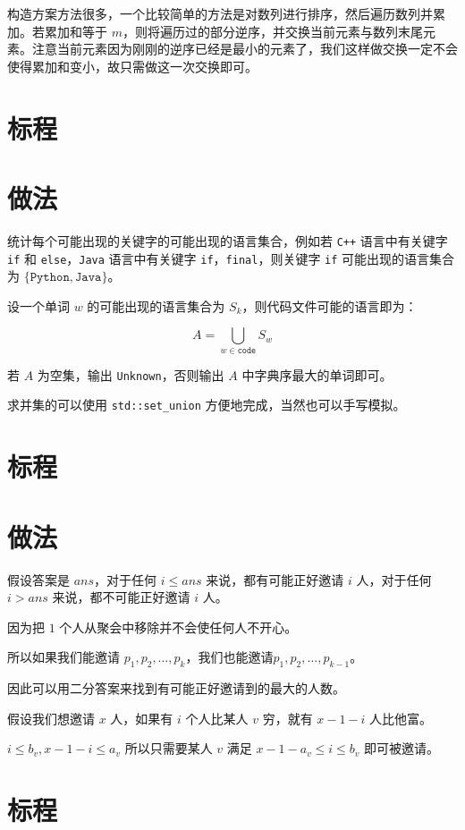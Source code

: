 \documentclass{../cpct/ctsol}
\begin{document}
构造方案方法很多，一个比较简单的方法是对数列进行排序，然后遍历数列并累加。若累加和等于 $m$，则将遍历过的部分逆序，并交换当前元素与数列末尾元素。注意当前元素因为刚刚的逆序已经是最小的元素了，我们这样做交换一定不会使得累加和变小，故只需做这一次交换即可。

\section*{标程}


\makesolution
\section*{做法}

统计每个可能出现的关键字的可能出现的语言集合，例如若 \texttt{C++} 语言中有关键字 \texttt{if} 和 \texttt{else}，\texttt{Java} 语言中有关键字 \texttt{if}，\texttt{final}，则关键字 \texttt{if} 可能出现的语言集合为 $\{\texttt{Python}, \texttt{Java}\}$。

设一个单词 $w$ 的可能出现的语言集合为 $S_k$，则代码文件可能的语言即为：

$$A = \bigcup\limits_{w \in \texttt{code}} S_w$$

若 $A$ 为空集，输出 \texttt{Unknown}，否则输出 $A$ 中字典序最大的单词即可。

求并集的可以使用 \lstinline{std::set_union} 方便地完成，当然也可以手写模拟。

\section*{标程}


\makesolution
\section*{做法}

假设答案是 $ans$，对于任何 $i \leq ans$ 来说，都有可能正好邀请 $i$ 人，对于任何 $i > ans$ 来说，都不可能正好邀请 $i$ 人。

因为把 $1$ 个人从聚会中移除并不会使任何人不开心。

所以如果我们能邀请 $p_1,p_2,\dots,p_k$，我们也能邀请$p_1,p_2,\dots,p_{k-1}$。

因此可以用二分答案来找到有可能正好邀请到的最大的人数。

假设我们想邀请 $x$ 人，如果有 $i$ 个人比某人 $v$ 穷，就有 $x-1-i$ 人比他富。

$i \leq b_v,x-1-i \leq a_v$ 所以只需要某人 $v$ 满足 $x-1-a_v \leq i \leq b_v$ 即可被邀请。

\section*{标程}

\end{document}
